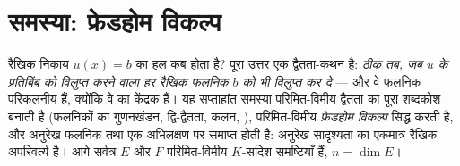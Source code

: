 \section{समस्या: फ्रेडहोम विकल्प}

रैखिक निकाय $u(x) = b$ का हल कब होता है? पूरा उत्तर एक द्वैतता-कथन है:
\emph{ठीक तब, जब $u$ के प्रतिबिंब को विलुप्त करने वाला हर रैखिक फलनिक
$b$ को भी विलुप्त कर दे} --- और वे फलनिक परिकलनीय हैं, क्योंकि वे
 का केंद्रक हैं। यह सप्ताहांत समस्या परिमित-विमीय द्वैतता का
पूरा शब्दकोश बनाती है (फलनिकों का गुणनखंडन, द्वि-द्वैतता,  कलन,
), परिमित-विमीय \emph{फ्रेडहोम विकल्प} सिद्ध करती है, और अनुरेख
फलनिक तथा एक अभिलक्षण पर समाप्त होती है: अनुरेख सादृश्यता का एकमात्र
रैखिक अपरिवर्त्य है। आगे सर्वत्र $E$ और $F$ परिमित-विमीय $K$-सदिश
समष्टियाँ हैं, $n = \dim E$।

